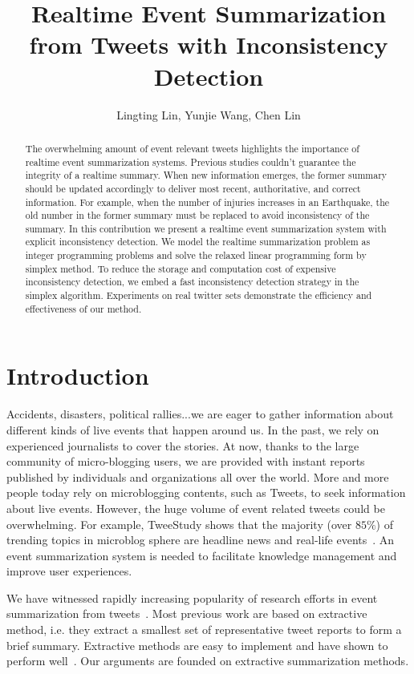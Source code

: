 \documentclass[envcountsame]{llncs}
\begin{document}
\title{Realtime Event Summarization from Tweets with Inconsistency Detection}
\author{Lingting Lin, Yunjie Wang, Chen Lin}

\maketitle
\begin{abstract}
The overwhelming amount of event relevant tweets highlights the importance of realtime event summarization systems. Previous studies couldn't guarantee the integrity of a realtime summary. When new information emerges, the former summary should be updated accordingly to deliver most recent, authoritative, and correct information. For example, when the number of injuries increases in an Earthquake, the old number in the former summary must be replaced to avoid inconsistency of the summary. In this contribution we present a realtime event summarization system with explicit inconsistency detection. We model the realtime summarization problem as integer programming problems and solve the relaxed linear programming form by simplex method. To reduce the storage and computation cost of expensive inconsistency detection, we embed a fast inconsistency detection strategy in the simplex algorithm. Experiments on real twitter sets demonstrate the efficiency and effectiveness of our method. 
\end{abstract}
\section{Introduction}
Accidents, disasters, political rallies...we are eager to gather information about different kinds of live events that happen around us. In the past, we rely on experienced journalists to cover the stories. At now, thanks to the large community of micro-blogging users, we are provided with instant reports published by individuals and organizations all over the world.  More and more people today rely on microblogging contents, such as Tweets, to seek information about live events. However, the huge volume of event related tweets could be overwhelming. For example, TweeStudy shows that the majority (over $85\%$) of trending topics in microblog sphere are headline news and real-life events~\cite{kwak2010twitter}. An event summarization system is needed to facilitate knowledge management and improve user experiences.

We have witnessed rapidly increasing popularity of research efforts in event summarization from tweets~\cite{Takamura2011Summarizing,Lin2012Generating,Rudra2015Extracting,Shou2013Sumblr,Liu2016LEDS,Gillani2017Post,Zubiaga2012Towards,Sharifi2010Summarizing}.   Most previous work are based on extractive method, i.e. they extract a smallest set of representative tweet reports to form a brief summary. Extractive methods are easy to implement and have shown to perform well~\cite{Takamura2011Summarizing,Lin2012Generating,Rudra2015Extracting,Shou2013Sumblr,Liu2016LEDS,Gillani2017Post,Zubiaga2012Towards}. Our arguments are founded on extractive summarization methods.
\end{document}
